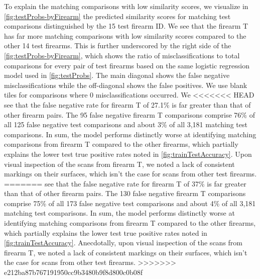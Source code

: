 \documentclass[reprint]{JASA}
\begin{document}
To explain the matching comparisons with low similarity scores, we
visualize in \autoref{fig:testProbs-byFirearm} the predicted similarity
scores for matching test comparisons distinguished by the 15 test
firearm ID. We see that the firearm T has far more matching comparisons
with low similarity scores compared to the other 14 test firearms. This
is further underscored by the right side of the
\autoref{fig:testProbs-byFirearm}, which shows the ratio of
misclassifications to total comparisons for every pair of test firearms
based on the same logistic regression model used in
\autoref{fig:testProbs}. The main diagonal shows the false negative
misclassifications while the off-diagonal shows the false positives. We
use blank tiles for comparisons where 0 misclassifications occurred. We
<<<<<<< HEAD
see that the false negative rate for firearm T of 27.1\% is far greater
than that of other firearm pairs. The 95 false negative firearm T
comparisons comprise 76\% of all 125 false negative test comparisons and
about 3\% of all 3,181 matching test comparisons. In sum, the model
performs distinctly worse at identifying matching comparisons from
firearm T compared to the other firearms, which partially explains the
lower test true positive rates noted in \autoref{fig:trainTestAccuracy}.
Upon visual inspection of the scans from firearm T, we noted a lack of
consistent markings on their surfaces, which isn't the case for scans
from other test firearms.
=======
see that the false negative rate for firearm T of 37\% is far greater
than that of other firearm pairs. The 130 false negative firearm T
comparisons comprise 75\% of all 173 false negative test comparisons and
about 4\% of all 3,181 matching test comparisons. In sum, the model
performs distinctly worse at identifying matching comparisons from
firearm T compared to the other firearms, which partially explains the
lower test true positive rates noted in \autoref{fig:trainTestAccuracy}.
Anecdotally, upon visual inspection of the scans from firearm T, we
noted a lack of consistent markings on their surfaces, which isn't the
case for scans from other test firearms.
>>>>>>> e212ba87b767191950cc9b3480b9f8d800c0b08f
\end{document}
